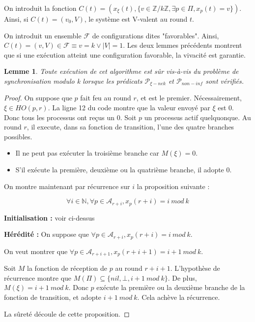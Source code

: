\documentclass{article}
\newtheorem{lemma}{Lemme}
\begin{document}
On introduit la fonction $C(t) = (x_\xi(t), \{v \in \mathds{Z}/k\mathds{Z}, \exists p \in \Pi, x_p(t) = v\})$.
Ainsi, si $C(t) = (v_0, V)$, le système est V-valent au round $t$.

On introduit un ensemble $\mathcal{F}$ de configurations dites "favorables".
Ainsi, $C(t) = (v, V) \in \mathcal{F} \equiv v = k \vee |V| = 1$.
Les deux lemmes précédents montrent que si une exécution atteint une configuration favorable, la vivacité est garantie.

\begin{lemma}
	Toute exécution de cet algorithme est sûr vis-à-vis du problème de synchronisation modulo k lorsque les prédicats $\mathcal{P}_{\xi-nek}$ et $\mathcal{P}_{non-inf}$ sont vérifiés.
\end{lemma}
\begin{proof}

	On suppose que $p$ fait feu au round $r$, et est le premier. Nécessairement, $\xi \in HO(p,r)$.
	La ligne 12 du code montre que la valeur envoyé par $\xi$ est 0.
	Donc tous les processus ont reçus un 0. Soit $p$ un processus actif quelquonque. Au round $r$, il execute, dans sa fonction de transition, l'une des quatre branches possibles.
	\begin{itemize}

		\item Il ne peut pas exécuter la troisième branche car $M(\xi) = 0$.
		\item S'il exécute la première, deuxième ou la quatrième branche, il adopte 0.

	\end{itemize}

	On montre maintenant par récurrence sur $i$ la proposition suivante :

	$$\forall i \in \mathds{N}, \forall p \in \mathcal{A}_{r+i}, x_p(r+i) = i~mod~k$$

	\textbf{Initialisation : } voir ci-dessus

	\textbf{Hérédité :}
	On suppose que $\forall p \in \mathcal{A}_{r+i}, x_p(r+i) = i~mod~k$.

	On veut montrer que $\forall p \in \mathcal{A}_{r+i+1}, x_p(r+i+1) = i+1~mod~k$.

	Soit $M$ la fonction de réception de $p$ au round $r+i+1$.
	L'hypothèse de récurrence montre que $M(\Pi) \subseteq \{nil, \bot, i+1~mod~k\}$.
	De plus, $M(\xi) = i+1~mod~k$. Donc $p$ exécute la première ou la deuxième branche de la fonction de transition, et adopte $i+1~mod~k$.
	Cela achève la récurrence.

	La sûreté découle de cette proposition.

\end{proof}
\end{document}
